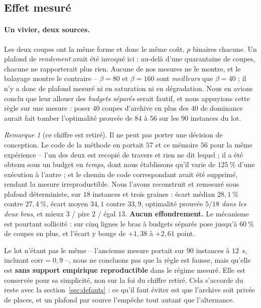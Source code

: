 \documentclass[11pt,a4paper]{article}
\theoremstyle{plain}
\theoremstyle{remark}
\newtheorem{remark}{Remarque}
\begin{document}
\subsection{Effet mesuré}

\paragraph{Un vivier, deux sources.} Les deux coupes ont la même forme et
donc le même coût, $p$ binaires chacune. Un plafond de \emph{rendement}
avait été invoqué ici : au-delà d'une quarantaine de coupes, chacune ne
rapporterait plus rien. Aucune de nos mesures ne le montre, et le balayage
montre le contraire -- $\beta=80$ et $\beta=160$ sont \emph{meilleurs} que
$\beta=40$ ; il n'y a donc de plafond mesuré ni en saturation ni en
dégradation. Nous en avions conclu que leur
allouer des \emph{budgets séparés} serait fautif, et nous appuyions cette
règle sur une mesure : poser $40$ coupes d'archive en plus des $40$ de
dominance aurait fait tomber l'optimalité prouvée de $84$ à $56$ sur les
$90$ instances du lot.

\begin{remark}[ce chiffre est retiré]
Il ne peut pas porter une décision de conception. Le code de la méthode en
portait $57$ et ce mémoire $56$ pour la même expérience -- l'un des deux est
recopié de travers et rien ne dit lequel ; il a été obtenu sous un budget en
\emph{temps}, dont nous établissons qu'il varie de $125\ \%$ d'une exécution
à l'autre ; et le chemin de code correspondant avait été supprimé, rendant
la mesure irreproductible. Nous l'avons reconstruit et remesuré sous plafond
déterministe, sur $18$ instances et trois graines : écart médian
$28{,}1\ \%$ contre $27{,}4\ \%$, écart moyen $34{,}1$ contre $33{,}9$,
optimalité prouvée $5/18$ \emph{dans les deux bras}, et mieux $3$ / pire $2$
/ égal $13$. \textbf{Aucun effondrement.} Le mécanisme est pourtant
sollicité : sur cinq lignes le bras à budgets séparés pose jusqu'à
$60\ \%$ de coupes en plus, et l'écart y bouge de $+1{,}38$ à $+2{,}61$
point.

Le lot n'étant pas le même -- l'ancienne mesure portait sur $90$ instances à
$12$~s, incluant $\text{corr}=0{,}9$ --, nous ne concluons pas que la règle
est fausse, mais qu'elle est \textbf{sans support empirique reproductible}
dans le régime mesuré. Elle est conservée pour sa simplicité, non sur la foi
du chiffre retiré. Cela s'accorde du reste avec la
section~\ref{sec:defauts} : ce qu'il faut éviter est que l'archive soit
privée de places, et un plafond par source l'empêche tout autant que
l'alternance.
\end{remark}
\end{document}
